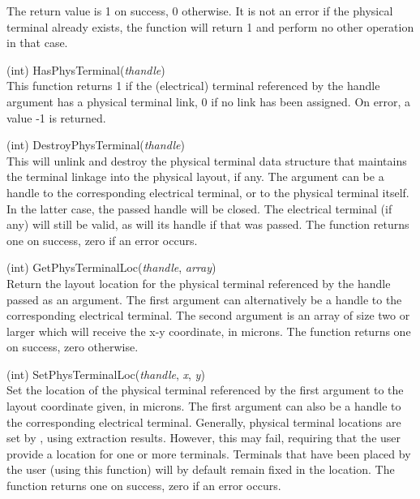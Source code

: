 \begin{description}
The return value is 1 on success, 0 otherwise.  It is not an error if
the physical terminal already exists, the function will return 1 and
perform no other operation in that case.

\item{(int) \vt HasPhysTerminal({\it thandle\/})}\\
This function returns 1 if the (electrical) terminal referenced by the
handle argument has a physical terminal link, 0 if no link has been
assigned.  On error, a value -1 is returned.

\item{(int) \vt DestroyPhysTerminal({\it thandle\/})}\\
This will unlink and destroy the physical terminal data structure that
maintains the terminal linkage into the physical layout, if any.  The
argument can be a handle to the corresponding electrical terminal, or
to the physical terminal itself.  In the latter case, the passed
handle will be closed.  The electrical terminal (if any) will still be
valid, as will its handle if that was passed.  The function returns
one on success, zero if an error occurs.

\item{(int) \vt GetPhysTerminalLoc({\it thandle\/}, {\it array\/})}\\
Return the layout location for the physical terminal referenced by the
handle passed as an argument.  The first argument can alternatively be
a handle to the corresponding electrical terminal.  The second
argument is an array of size two or larger which will receive the x-y
coordinate, in microns.  The function returns one on success, zero
otherwise.

\item{(int) \vt SetPhysTerminalLoc({\it thandle\/}, {\it x\/}, {\it y\/})}\\
Set the location of the physical terminal referenced by the first
argument to the layout coordinate given, in microns.  The first
argument can also be a handle to the corresponding electrical
terminal.  Generally, physical terminal locations are set by {\Xic},
using extraction results.  However, this may fail, requiring that the
user provide a location for one or more terminals.  Terminals that
have been placed by the user (using this function) will by default
remain fixed in the location.  The function returns one on success,
zero if an error occurs.


\end{description}
